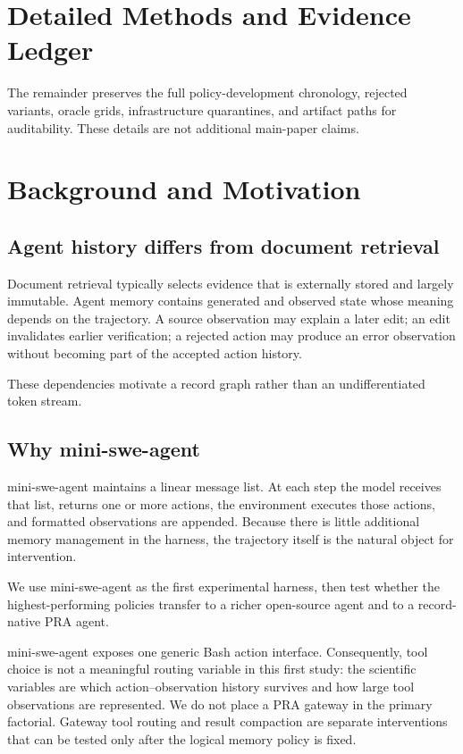 \documentclass[11pt]{article}
\begin{document}
\ifdefined\PaperEightFiveTechnicalReport
\clearpage
\appendix
\section{Detailed Methods and Evidence Ledger}
\label{sec:detailed-evidence-ledger}

The remainder preserves the full policy-development chronology, rejected
variants, oracle grids, infrastructure quarantines, and artifact paths for
auditability.  These details are not additional main-paper claims.

\section{Background and Motivation}

\subsection{Agent history differs from document retrieval}

Document retrieval typically selects evidence that is externally stored and
largely immutable. Agent memory contains generated and observed state whose
meaning depends on the trajectory. A source observation may explain a later
edit; an edit invalidates earlier verification; a rejected action may produce
an error observation without becoming part of the accepted action history.

These dependencies motivate a record graph rather than an undifferentiated
token stream.

\subsection{Why mini-swe-agent}

mini-swe-agent maintains a linear message list. At each step the model receives
that list, returns one or more actions, the environment executes those actions,
and formatted observations are appended. Because there is little additional
memory management in the harness, the trajectory itself is the natural object
for intervention.

We use mini-swe-agent as the first experimental harness, then test whether the
highest-performing policies transfer to a richer open-source agent and to a
record-native PRA agent.

mini-swe-agent exposes one generic Bash action interface. Consequently, tool
choice is not a meaningful routing variable in this first study: the scientific
variables are which action--observation history survives and how large tool
observations are represented. We do not place a PRA gateway in the primary
factorial. Gateway tool routing and result compaction are separate interventions
that can be tested only after the logical memory policy is fixed.
\end{document}
